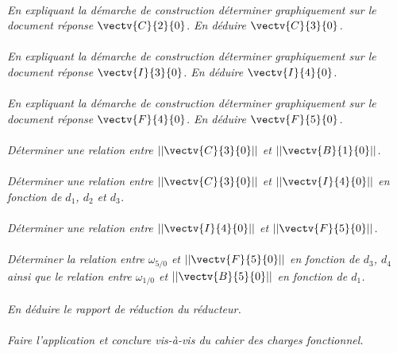 \documentclass[11pt,oneside]{article}
\begin{document}
\paragraph{}
\textit{En expliquant la démarche de construction déterminer graphiquement sur le document réponse $\vectv{C}{2}{0}$. En déduire $\vectv{C}{3}{0}$.}

\paragraph{}
\textit{En expliquant la démarche de construction déterminer graphiquement sur le document réponse $\vectv{I}{3}{0}$. En déduire $\vectv{I}{4}{0}$.}

\paragraph{}
\textit{En expliquant la démarche de construction déterminer graphiquement sur le document réponse $\vectv{F}{4}{0}$. En déduire $\vectv{F}{5}{0}$.}

\paragraph{}
\textit{Déterminer une relation entre $||\vectv{C}{3}{0}||$ et $||\vectv{B}{1}{0}||$.}

\paragraph{}
\textit{Déterminer une relation entre $||\vectv{C}{3}{0}||$ et $||\vectv{I}{4}{0}||$ en fonction de $d_1$, $d_2$ et $d_3$.}

\paragraph{}
\textit{Déterminer une relation entre $||\vectv{I}{4}{0}||$ et $||\vectv{F}{5}{0}||$.}

\paragraph{}
\textit{Déterminer la relation entre $\omega_{5/0}$ et $||\vectv{F}{5}{0}||$ en fonction de $d_3$, $d_4$ ainsi que le relation entre $\omega_{1/0}$ et $||\vectv{B}{5}{0}||$ en fonction de $d_1$.}

\paragraph{}
\textit{En déduire le rapport de réduction du réducteur.}

\paragraph{}
\textit{Faire l'application et conclure vis-à-vis du cahier des charges fonctionnel.}


\begin{center}
\end{center}
\end{document}
